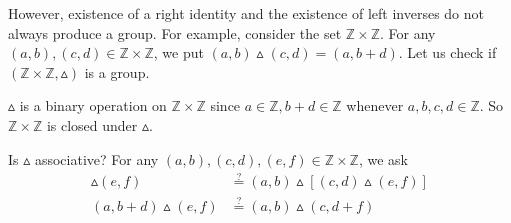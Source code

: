 \documentclass[11pt]{amsbook}
\begin{document}
	However, existence of a right identity and the existence of left inverses
	do not always produce a group. For example, consider the set $\mathbb{Z} \times \mathbb{Z}$. For
	any $(a, b), (c, d) \in \mathbb{Z} \times \mathbb{Z}$, we put $(a, b) \vartriangle (c, d) = (a, b + d)$. Let us check if
	$(\mathbb{Z} \times \mathbb{Z}, \vartriangle)$ is a group.
	\begin{hEnumerateRoman}
		\item $\vartriangle$ is a binary operation on $\mathbb{Z} \times \mathbb{Z}$ since $a \in \mathbb{Z}, b + d \in \mathbb{Z}$
		whenever $a, b, c, d \in \mathbb{Z}$. So $\mathbb{Z} \times \mathbb{Z}$ is closed under $\vartriangle$.
		\item Is $\vartriangle$ associative? For any $(a, b), (c, d), (e, f) \in \mathbb{Z} \times \mathbb{Z}$, we ask
		\begin{align*}
			[(a, b) \vartriangle (c, d)] \vartriangle (e, f) &\stackrel{?}{=} (a, b) \vartriangle [(c, d) \vartriangle (e, f)]\\
			(a, b + d) \vartriangle (e, f) &\stackrel{?}{=} (a, b) \vartriangle (c, d + f)
		\end{align*}
	\end{hEnumerateRoman}
\end{document}
